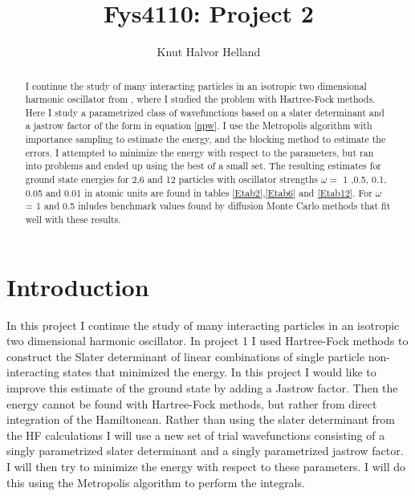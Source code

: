 \documentclass[a4paper,English,10pt]{article}
\title{Fys4110: Project 2}
\author{Knut Halvor Helland}
\begin{document}
\maketitle{}
\begin{abstract}
  I continue the study of many interacting particles in an isotropic two dimensional harmonic oscillator from \cite{proj1},
  where I studied the problem with Hartree-Fock methods. Here I study a parametrized class of wavefunctions based on a slater determinant
  and a jastrow factor of the form in equation \ref{npw}. I use the Metropolis algorithm with importance sampling to estimate the energy,
  and the blocking method to estimate the errors. I attempted to minimize the energy with respect to the parameters, but ran into problems
  and ended up using the best of a small set. The resulting estimates for ground state energies for 2,6 and 12 particles with oscillator strengths
  $\omega =$ 1 ,0.5, 0.1, 0.05 and 0.01 in atomic units are found in tables \ref{Etab2},\ref{Etab6} and \ref{Etab12}.
  For $\omega$ = 1 and 0.5 \cite{mortenref} inludes benchmark values
  found by diffusion Monte Carlo methods that fit well with these results.

\end{abstract}

\tableofcontents
\listoftables

\section{Introduction}
In this project I continue the study of many interacting particles in an isotropic two dimensional harmonic oscillator.
In project 1 \cite{proj1} I used Hartree-Fock methods to construct the Slater determinant of linear combinations of single
particle non-interacting states that minimized the energy. In this project I would like to improve this estimate of the ground state
by adding a Jastrow factor. Then the energy cannot be found with Hartree-Fock methods, but rather from direct integration of the Hamiltonean.
Rather than using the slater determinant from the HF calculations I will use a new set of trial wavefunctions consisting of a singly parametrized
slater determinant and a singly parametrized jastrow factor. I will then try to minimize the energy with respect to these parameters.
I will do this using the Metropolis algorithm to perform the integrals.
\end{document}
